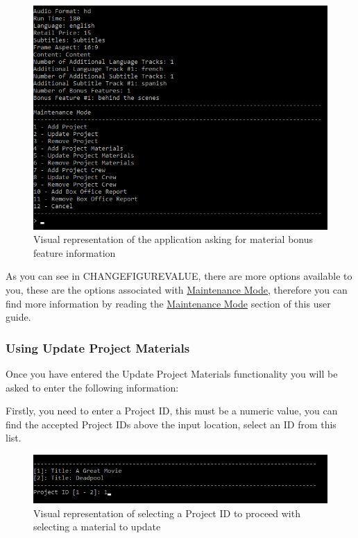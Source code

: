 \documentclass[
  english,
  a4paper,
,tablecaptionabove
]{scrartcl}
\begin{document}
\begin{figure}
\centering
\includegraphics{images/user-guide/maintenance-mode/add-material-bonus-features.png}
\caption{Visual representation of the application asking for material
bonus feature information}
\end{figure}

As you can see in CHANGEFIGUREVALUE, there are more options available to
you, these are the options associated with
\protect\hyperlink{using-maintenance-mode}{Maintenance Mode}, therefore
you can find more information by reading the
\protect\hyperlink{using-maintenance-mode}{Maintenance Mode} section of
this user guide.

\newpage

\hypertarget{using-update-project-materials}{%
\subsubsection{Using Update Project
Materials}\label{using-update-project-materials}}

Once you have entered the Update Project Materials functionality you
will be asked to enter the following information:

Firstly, you need to enter a Project ID, this must be a numeric value,
you can find the accepted Project IDs above the input location, select
an ID from this list.

\begin{figure}
\centering
\includegraphics{images/user-guide/maintenance-mode/update-project-select-id.png}
\caption{Visual representation of selecting a Project ID to proceed with
selecting a material to update}
\end{figure}
\end{document}
